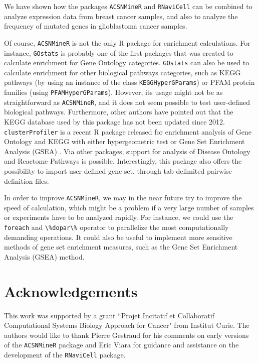 \documentclass{article}
\begin{document}
We have shown how the packages \verb|ACSNMineR| and \verb|RNaviCell| can be
combined to analyze expression data from breast cancer samples, and also to
analyze the frequency of mutated genes in glioblastoma cancer samples.  

Of course, \verb|ACSNMineR| is not the only R package for enrichment
calculations. For instance, \verb|GOstats| \cite{falcon2007using} is probably
one of the first packages that was created to calculate enrichment for Gene
Ontology categories.  \verb|GOstats| can also be used to calculate enrichment for
other biological pathways categories, such as KEGG pathways (by using an
instance of the class \verb|KEGGHyperGParams|) or PFAM protein families (using
\verb|PFAMHyperGParams|). However, its usage might not be as straightforward as
\verb|ACSNMineR|, and it does not seem possible to test user-defined biological
pathways. Furthermore, other authors have pointed out that the KEGG database
used by this package has not been updated since 2012. \verb|clusterProfiler| is a
recent R package released for enrichment analysis of Gene Ontology and KEGG with
either hypergeometric test or Gene Set Enrichment Analysis (GSEA)
\cite{yu2012clusterprofiler}. Via other packages, support for analysis of
Disease Ontology and Reactome Pathways is possible. Interestingly, this package
also offers the possibility to import user-defined gene set, through
tab-delimited pairwise definition files.   

In order to improve \verb|ACSNMineR|, we may in the near future try to improve
the speed of calculation, which might be a problem if a very large number of
samples or experiments have to be analyzed rapidly. For instance, we could use
the \verb|foreach| and \verb|\%dopar\%| operator to parallelize the most
computationally demanding operations. It could also be useful to implement more
sensitive methods of gene set enrichment measures, such as the Gene Set
Enrichment Analysis (GSEA) method. 


\section[Acknowledgments]{Acknowledgements}

This work was supported by a grant ``Projet Incitatif et Collaboratif
Computational Systems Biology Approach for Cancer" from Institut Curie. The
authors would like to thank Pierre Gestraud for his comments on early versions
of the \verb|ACSNMineR| package and Eric Viara for guidance and assistance on
the development of the \verb|RNaviCell| package.
\end{document}
